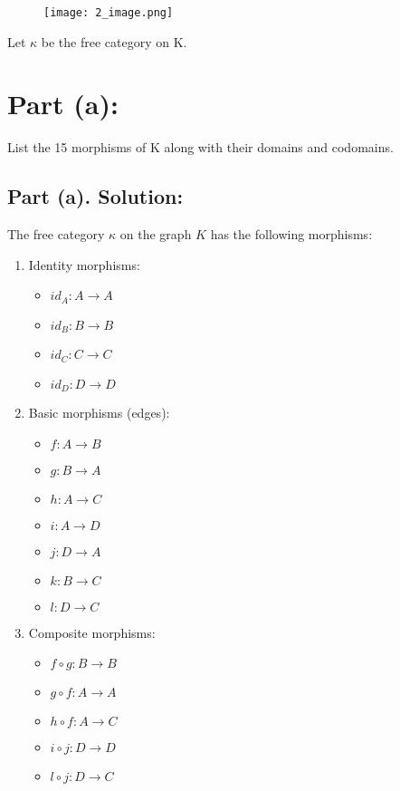\documentclass{article}
\begin{document}
\begin{figure}[h!]
    \centering
    \texttt{[image: 2\_image.png]} %
    \label{fig:sample-image}
\end{figure} 

Let $\kappa$ be the free category on K.
\section*{Part (a):} List the 15 morphisms of K along with their domains and codomains.
\subsection*{Part (a). Solution:}

The free category \(\kappa\) on the graph \(K\) has the following morphisms:

\begin{enumerate}
    \item Identity morphisms:
    \begin{itemize}
        \item \(id_A: A \to A\)
        \item \(id_B: B \to B\)
        \item \(id_C: C \to C\)
        \item \(id_D: D \to D\)
    \end{itemize}
    
    \item Basic morphisms (edges):
    \begin{itemize}
        \item \(f: A \to B\)
        \item \(g: B \to A\)
        \item \(h: A \to C\)
        \item \(i: A \to D\)
        \item \(j: D \to A\)
        \item \(k: B \to C\)
        \item \(l: D \to C\)
    \end{itemize}
    
    \item Composite morphisms:
    \begin{itemize}
        \item \(f \circ g: B \to B\)
        \item \(g \circ f: A \to A\)
        \item \(h \circ f: A \to C\)
        \item \(i \circ j: D \to D\)
        \item \(l \circ j: D \to C\)
    \end{itemize}
    
    
\end{enumerate}
\end{document}
